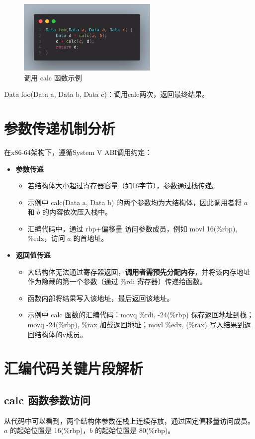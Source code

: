 \documentclass{article}
\begin{document}
\begin{figure}[htbp]
    \centering
    \includegraphics[width=0.6\textwidth]{pics/foo.png}
    \caption{调用 calc 函数示例}
\end{figure}
Data foo(Data a, Data b, Data c)：调用calc两次，返回最终结果。


\newpage
\section{参数传递机制分析}
在x86-64架构下，遵循System V ABI调用约定：
\begin{itemize}
\item \textbf{参数传递}
\begin{itemize}
   \item 若结构体大小超过寄存器容量（如16字节），参数通过栈传递。  
   \item 示例中 calc(Data a, Data b) 的两个参数均为大结构体，因此调用者将 $a$ 和 $b$ 的内容依次压入栈中。
   \item 汇编代码中，通过 rbp+偏移量 访问参数成员，例如 movl 16(\%rbp), \%edx，访问 $a$ 的首地址。
\end{itemize}
\item \textbf{返回值传递}
\begin{itemize}
   \item 大结构体无法通过寄存器返回，\textbf{调用者需预先分配内存}，并将该内存地址作为隐藏的第一个参数（通过 \%rdi 寄存器）传递给函数。
   \item 函数内部将结果写入该地址，最后返回该地址。  
   \item 示例中 calc 函数的汇编代码：movq \%rdi, -24(\%rbp) 保存返回地址到栈；movq -24(\%rbp), \%rax 加载返回地址；movl \%edx, (\%rax) 写入结果到返回结构体的v成员。
\end{itemize}  
\end{itemize}

\section{汇编代码关键片段解析}
\subsection{calc 函数参数访问}
从代码中可以看到，两个结构体参数在栈上连续存放，通过固定偏移量访问成员。$a$ 的起始位置是 16(\%rbp)，$b$ 的起始位置是 80(\%rbp)。
\end{document}
